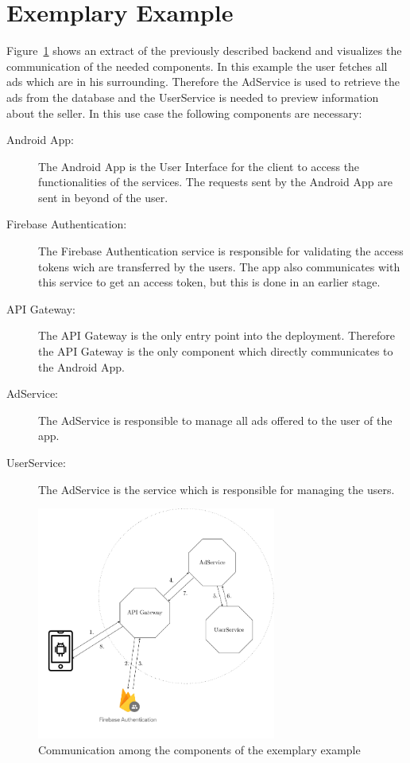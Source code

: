 \section{Exemplary Example}
Figure~\ref{fig:deployment_structure} shows an extract of the previously described backend and visualizes the communication of the needed components.
In this example the user fetches all ads which are in his surrounding.
Therefore the AdService is used to retrieve the ads from the database and the UserService is needed to preview information about the seller.
In this use case the following components are necessary:
\begin{description}
	\item[Android App:] The Android App is the User Interface for the client to access the functionalities of the services.
		The requests sent by the Android App are sent in beyond of the user.
	\item[Firebase Authentication:] The Firebase Authentication service is responsible for validating the access tokens wich are transferred by the users.
		The app also communicates with this service to get an access token, but this is done in an earlier stage.
	\item[API Gateway:] The API Gateway is the only entry point into the deployment.
		Therefore the API Gateway is the only component which directly communicates to the Android App.
	\item[AdService:] The AdService is responsible to manage all ads offered to the user of the app.
	\item[UserService:] The AdService is the service which is responsible for managing the users. 
\end{description}

\begin{figure}
	\centering
	\includegraphics[width=0.7\textwidth]{images/project-structure/TikZ_structure.pdf}
	\caption{Communication among the components of the exemplary example}
	\label{fig:deployment_structure}
\end{figure}

